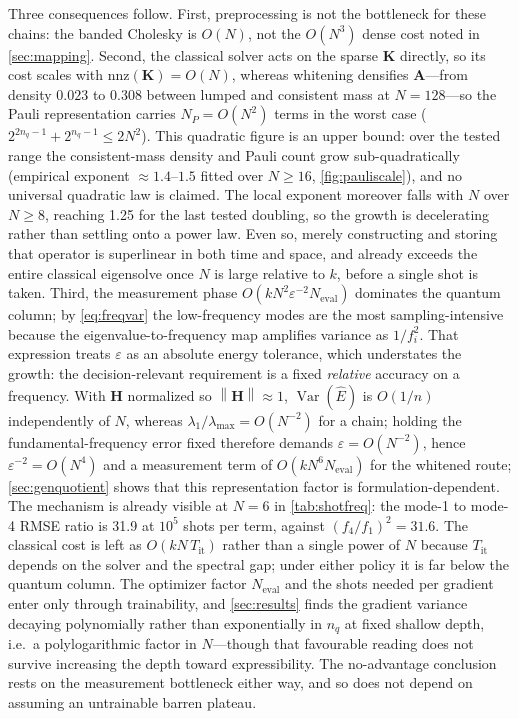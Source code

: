 \documentclass{ieeeaccess}
\newcommand{\K}{\mathbf{K}}
\newcommand{\A}{\mathbf{A}}
\newcommand{\Hq}{\mathbf{H}}
\newcommand{\norm}[1]{\left\lVert #1\right\rVert}
\newcommand{\Var}{\operatorname{Var}}
\begin{document}
Three consequences follow. First, preprocessing is not the bottleneck for these chains: the banded Cholesky is $O(N)$, not the $O(N^3)$ dense cost noted in \cref{sec:mapping}. Second, the classical solver acts on the sparse $\K$ directly, so its cost scales with $\mathrm{nnz}(\K)=O(N)$, whereas whitening densifies $\A$---from density $0.023$ to $0.308$ between lumped and consistent mass at $N=128$---so the Pauli representation carries $N_P=O(N^2)$ terms in the worst case ($2^{2n_q-1}+2^{n_q-1}\le2N^2$). This quadratic figure is an upper bound: over the tested range the consistent-mass density and Pauli count grow sub-quadratically (empirical exponent ${\approx}1.4$--$1.5$ fitted over $N\ge16$, \cref{fig:pauliscale}), and no universal quadratic law is claimed. The local exponent moreover falls with $N$ over $N\ge8$, reaching 1.25 for the last tested doubling, so the growth is decelerating rather than settling onto a power law. Even so, merely constructing and storing that operator is superlinear in both time and space, and already exceeds the entire classical eigensolve once $N$ is large relative to $k$, before a single shot is taken. Third, the measurement phase $O(kN^2\varepsilon^{-2}N_{\mathrm{eval}})$ dominates the quantum column; by \cref{eq:freqvar} the low-frequency modes are the most sampling-intensive because the eigenvalue-to-frequency map amplifies variance as $1/f_i^2$. That expression treats $\varepsilon$ as an absolute energy tolerance, which understates the growth: the decision-relevant requirement is a fixed \emph{relative} accuracy on a frequency. With $\Hq$ normalized so $\norm{\Hq}\approx1$, $\Var(\widehat E)$ is $O(1/n)$ independently of $N$, whereas $\lambda_1/\lambda_{\max}=O(N^{-2})$ for a chain; holding the fundamental-frequency error fixed therefore demands $\varepsilon=O(N^{-2})$, hence $\varepsilon^{-2}=O(N^{4})$ and a measurement term of $O(kN^{6}N_{\mathrm{eval}})$ for the whitened route; \cref{sec:genquotient} shows that this representation factor is formulation-dependent. The mechanism is already visible at $N=6$ in \cref{tab:shotfreq}: the mode-1 to mode-4 RMSE ratio is 31.9 at $10^5$ shots per term, against $(f_4/f_1)^2=31.6$. The classical cost is left as $O(kN\,T_{\mathrm{it}})$ rather than a single power of $N$ because $T_{\mathrm{it}}$ depends on the solver and the spectral gap; under either policy it is far below the quantum column. The optimizer factor $N_{\mathrm{eval}}$ and the shots needed per gradient enter only through trainability, and \cref{sec:results} finds the gradient variance decaying polynomially rather than exponentially in $n_q$ at fixed shallow depth, i.e.\ a polylogarithmic factor in $N$---though that favourable reading does not survive increasing the depth toward expressibility. The no-advantage conclusion rests on the measurement bottleneck either way, and so does not depend on assuming an untrainable barren plateau.
\end{document}
